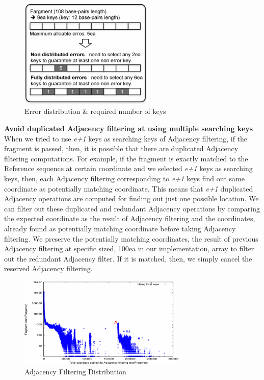 \begin{figure}[b] \centering \vspace{0.1in}
\includegraphics[width=2.5in]{./figure/pigeon_B.pdf} \vspace{0in}
\caption{Error distribution \& required number of keys}
\label{fig:pigeon} 
\end{figure}

\textbf{Avoid duplicated Adjacency filtering at using multiple searching keys}
When we tried to use \textit{e+1} keys as searching keys of Adjacency
filtering, if the fragment is passed, then, it is possible that there are
duplicated Adjacency filtering computations. For example, if the fragment is
exactly matched to the Reference sequence at certain coordinate and we selected
\textit{e+1} keys as searching keys, then, each Adjacency filtering
corresponding to \textit{e+1} keys find out same coordinate as potentially
matching coordinate. This means that \textit{e+1} duplicated Adjacency
operations are computed for finding out just one possible location. We can
filter out these duplicated and redundant Adjacency operations by comparing the
expected coordinate as the result of Adjacency filtering and the coordinates,
already found as potentially matching coordinate before taking Adjacency
filtering.  We preserve the potentially matching coordinates, the result of
previous Adjacency filtering at specific sized, 100ea in our implementation,
array to filter out the redundant Adjacency filter.  If it is matched, then, we
simply cancel the reserved Adjacency filtering.

\begin{figure}[t] \centering \vspace{0.1in}
\includegraphics[height=1.7in]{./figure/Key_Dist_B.pdf} \vspace{0in}
\caption{Adjacency Filtering Distribution} 
\label{fig:key_dist} 
\end{figure}

